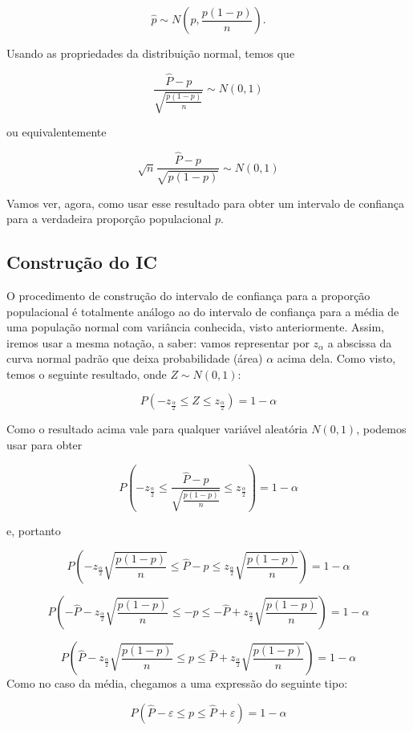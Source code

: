 \documentclass[
]{book}
\begin{document}
\[\hat p \sim N\left(p,\frac{p(1-p)}{n}\right).\]

Usando as propriedades da distribuição normal, temos que

\[\frac{\hat P - p}{\sqrt{\frac{p(1-p)}{n}}}\sim N(0,1)\]

ou equivalentemente

\[\sqrt{n}\frac{\hat P - p}{\sqrt{p(1-p)}}\sim N(0,1)\]

Vamos ver, agora, como usar esse resultado para obter um intervalo de confiança para a verdadeira proporção populacional \(p\).

\hypertarget{construuxe7uxe3o-do-ic}{%
\subsection{Construção do IC}\label{construuxe7uxe3o-do-ic}}

O procedimento de construção do intervalo de confiança para a proporção populacional é totalmente análogo ao do intervalo de confiança para a média de uma população normal com variância conhecida, visto anteriormente. Assim, iremos usar a mesma notação, a saber: vamos representar por \(z_\alpha\) a abscissa da curva normal padrão que deixa probabilidade (área) \(\alpha\) acima dela. Como visto, temos o seguinte resultado, onde \(Z\sim N(0,1)\):

\[P\left(-z_\frac{\alpha}{2}\leq Z \leq z_\frac{\alpha}{2}\right)=1-\alpha\]

Como o resultado acima vale para qualquer variável aleatória \(N(0,1)\), podemos usar para obter

\[P\left(-z_{\frac{\alpha}{2}}\leq \frac{\hat P - p}{\sqrt{\frac{p(1-p)}{n}}} \leq z_{\frac{\alpha}{2}}\right)=1-\alpha\]

e, portanto

\[P\left(-z_{\frac{\alpha}{2}}\sqrt{\frac{p(1-p)}{n}} \leq \hat P - p \leq z_{\frac{\alpha}{2}}\sqrt{\frac{p(1-p)}{n}}\right)=1-\alpha\]

\[P\left(-\hat P -z_{\frac{\alpha}{2}}\sqrt{\frac{p(1-p)}{n}} \leq - p \leq -\hat P + z_{\frac{\alpha}{2}}\sqrt{\frac{p(1-p)}{n}}\right)=1-\alpha\]

\[P\left(\hat P - z_{\frac{\alpha}{2}}\sqrt{\frac{p(1-p)}{n}} \leq p \leq \hat P + z_{\frac{\alpha}{2}}\sqrt{\frac{p(1-p)}{n}}\right)=1-\alpha\]
Como no caso da média, chegamos a uma expressão do seguinte tipo:

\[P(\hat P -\varepsilon\leq p\leq\hat P + \varepsilon)=1-\alpha\]
\end{document}
